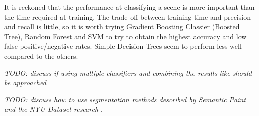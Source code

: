 \documentclass[11pt,openright,a4paper]{report}
\begin{document}
It is reckoned that the performance at classifying a scene is more important than the time required at training. The trade-off between training time and precision and recall is little, so it is worth trying Gradient Boosting Classier (Boosted Tree), Random Forest and SVM to try to obtain the highest accuracy and low false positive/negative rates. Simple Decision Trees seem to perform less well compared to the others. 

\textit{TODO: discuss if using multiple classifiers and combining the results like \cite{forestry} should be approached}

\textit{TODO: discuss how to use segmentation methods described by Semantic Paint \cite{semantic-paint} and the NYU Dataset research \cite{nyu-dataset}}.

\newpage




\end{document}
